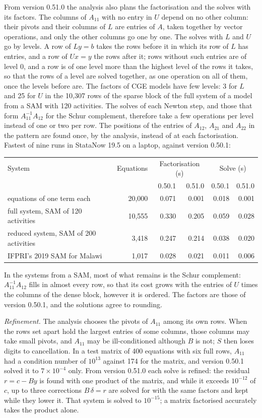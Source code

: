 From version 0.51.0 the analysis also plans the factorisation and the solves
with its factors. The columns of $A_{11}$ with no entry in $U$ depend on no
other column: their pivots and their columns of $L$ are entries of $A$, taken
together by vector operations, and only the other columns go one by one. The
solves with $L$ and $U$ go by levels. A row of $L y = b$ takes the rows
before it in which its row of $L$ has entries, and a row of $U x = y$ the
rows after it; rows without such entries are of level 0, and a row is of one
level more than the highest level of the rows it takes, so that the rows of
a level are solved together, as one operation on all of them, once the
levels before are. The factors of CGE models have few levels: 3 for $L$ and
25 for $U$ in the 10,307 rows of the sparse block of the full system of a
model from a SAM with 120 activities. The solves of each Newton step, and
those that form $A_{11}^{-1} A_{12}$ for the Schur complement, therefore take
a few operations per level instead of one or two per row. The positions of
the entries of $A_{12}$, $A_{21}$ and $A_{22}$ in the pattern are found once,
by the analysis, instead of at each factorisation. Fastest of nine runs in
StataNow 19.5 on a laptop, against version 0.50.1:
\begin{center}
\begin{tabular}{lrrrrr}
\toprule
System & Equations & \multicolumn{2}{c}{Factorisation (s)} & \multicolumn{2}{c}{Solve (s)}\\
 & & 0.50.1 & 0.51.0 & 0.50.1 & 0.51.0\\
\midrule
equations of one term each & 20,000 & 0.071 & 0.001 & 0.018 & 0.001\\
full system, SAM of 120 activities & 10,555 & 0.330 & 0.205 & 0.059 & 0.028\\
reduced system, SAM of 200 activities & 3,418 & 0.247 & 0.214 & 0.038 & 0.020\\
IFPRI's 2019 SAM for Malawi & 1,017 & 0.028 & 0.021 & 0.011 & 0.006\\
\bottomrule
\end{tabular}
\end{center}
In the systems from a SAM, most of what remains is the Schur complement:
$A_{11}^{-1} A_{12}$ fills in almost every row, so that its cost grows with
the entries of $U$ times the columns of the dense block, however it is
ordered. The factors are those of version 0.50.1, and the solutions agree to
rounding.

\textit{Refinement.} The analysis chooses the pivots of $A_{11}$ among its
own rows. When the rows set apart hold the largest entries of some columns,
those columns may take small pivots, and $A_{11}$ may be ill-conditioned
although $B$ is not; $S$ then loses digits to cancellation. In a test matrix
of 400 equations with six full rows, $A_{11}$ had a condition number of
$10^{13}$ against 174 for the matrix, and version 0.50.1 solved it to
$7 \times 10^{-4}$ only. From version 0.51.0 each solve is refined: the
residual $r = c - B y$ is found with one product of the matrix, and while it
exceeds $10^{-12}$ of $c$, up to three corrections $B\,\delta = r$ are solved
for with the same factors and kept while they lower it. That system is solved
to $10^{-15}$; a matrix factorised accurately takes the product alone.

